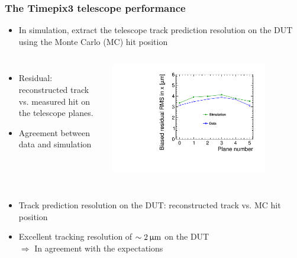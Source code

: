 \begin{frame}
  \frametitle{The Timepix3 telescope performance}

  \begin{itemize}
  \item In simulation, extract the telescope track prediction
    resolution on the DUT using the Monte Carlo (MC) hit position
  \end{itemize}

  \begin{columns}
    \begin{itemize}
    \item Residual: reconstructed track vs. measured hit on the
      telescope planes.
    \item Agreement between data and simulation 
    \end{itemize}

    \centering
    \includegraphics[width=0.8\textwidth]{../figures/Telescope/biasedResiduals/RMSX_simu_vs_data.pdf}
  \end{columns}

  \begin{columns}
    \begin{itemize}
    \item Track prediction resolution on the DUT: reconstructed track
      vs. MC hit position
    \item Excellent tracking resolution of
      \textcolor{Green}{$\sim2\,\upmu\mathrm{m}$} on the DUT
      \\
      $\Rightarrow$ In agreement with the expectations 
    \end{itemize}


\end{columns}
\end{frame}
